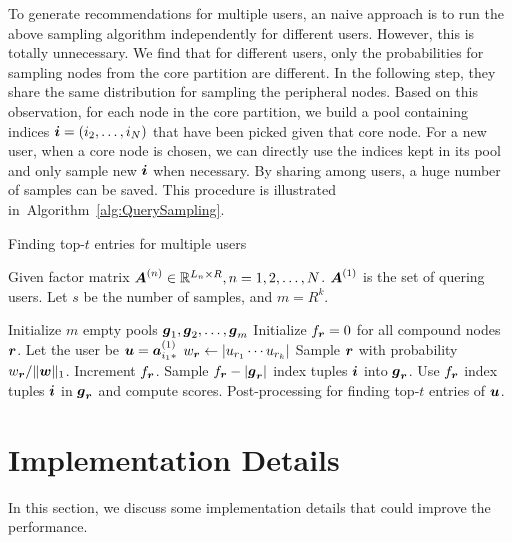 \documentclass[letterpaper]{article}
\newcommand{\V}[1]{{\boldsymbol{{\MakeLowercase{#1}}}}}
\newcommand{\RowVecA}[1]{\V{a}^{(#1)}_{i_#1*}}
\newcommand{\M}[1]{{\boldsymbol{{\MakeUppercase{#1}}}}}
\newcommand{\FacMat}[2]{\M{#1}^{(#2)}}
\newcommand{\norm}[2]{\|#1\|_{#2}}
\newcommand{\Alg}[1]{Algorithm~\ref{alg:#1}}
\begin{document}
To generate recommendations for multiple users, 
an naive approach is to run the above sampling algorithm independently for different users. 
However, this is totally unnecessary. 
We find that for different users, 
only the probabilities for sampling nodes from the core partition are different. 
In the following step, they share the same distribution for sampling the peripheral nodes. 
Based on this observation, for each node in the core partition, 
we build a pool containing indices $\V{i}=(i_2,\ldots,i_N)$ that have been picked given that core node. 
For a new user, when a core node is chosen, 
we can directly use the indices kept in its pool and only sample new $\V{i}$ when necessary. 
By sharing among users, a huge number of samples can be saved. 
This procedure is illustrated in~\Alg{QuerySampling}.

\begin{algorithm}[!ht]
    \caption{Finding top-$t$ entries for multiple users}
    \label{alg:QuerySampling}
        Given factor matrix $\FacMat{A}{n}\in \mathbb{R}^{L_n\times R}, n = 1,2,\ldots,N$.
        $\FacMat{A}{1}$ is the set of quering users.
        Let $s$ be the number of samples, and $m=R^k$.
    \begin{algorithmic}[1]
    \State Initialize $m$ empty pools $\V{g}_1,\V{g}_2,\ldots,\V{g}_m$
    \State Initialize $f_{\V{r}} = 0$ for all compound nodes $\V{r}$.
    \State Let the user be $\V{u}=\RowVecA{1}$
    \ForAll{$\V{r}=(r_1,\ldots,r_k)$}
    \State $w_\V{r} \leftarrow |u_{r_1}\cdots u_{r_k}|$
    \EndFor
    \State Sample $\V{r}$ with probability $w_\V{r}/\norm{\V{W}}{1}$.
    \label{line:Indexes}
    \State  Increment $f_{\V{r}}$.
    \EndFor
    \ForAll {$\V{r}$}
    \If {$f_\V{r} > |\V{g}_\V{r}|$ }
    \State Sample $f_{\V{r}} - |\V{g}_{\V{r}}|$ index tuples $\V{i}$ into $\V{g}_{\V{r}}$.
    \EndIf
    \State Use $f_{\V{r}}$ index tuples $\V{i}$ in $\V{g}_{\V{r}}$ and compute scores.
    \EndFor
    \State Post-processing for finding top-$t$ entries of $\V{u}$.
    \EndFor
    \end{algorithmic}
\end{algorithm}

\section{Implementation Details}
In this section, we discuss some implementation details that could improve the performance.
\end{document}
